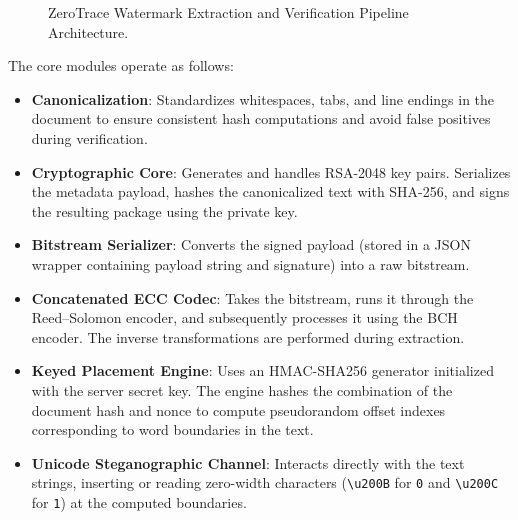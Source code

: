 \documentclass[conference]{IEEEtran}
\begin{document}
\begin{figure}[htbp]
\caption{ZeroTrace Watermark Extraction and Verification Pipeline Architecture.}
\label{fig:extract_pipeline}
\end{figure}

The core modules operate as follows:
\begin{itemize}
    \item \textbf{Canonicalization}: Standardizes whitespaces, tabs, and line endings in the document to ensure consistent hash computations and avoid false positives during verification.
    \item \textbf{Cryptographic Core}: Generates and handles RSA-2048 key pairs. Serializes the metadata payload, hashes the canonicalized text with SHA-256, and signs the resulting package using the private key.
    \item \textbf{Bitstream Serializer}: Converts the signed payload (stored in a JSON wrapper containing payload string and signature) into a raw bitstream.
    \item \textbf{Concatenated ECC Codec}: Takes the bitstream, runs it through the Reed--Solomon encoder, and subsequently processes it using the BCH encoder. The inverse transformations are performed during extraction.
    \item \textbf{Keyed Placement Engine}: Uses an HMAC-SHA256 generator initialized with the server secret key. The engine hashes the combination of the document hash and nonce to compute pseudorandom offset indexes corresponding to word boundaries in the text.
    \item \textbf{Unicode Steganographic Channel}: Interacts directly with the text strings, inserting or reading zero-width characters (\texttt{\textbackslash u200B} for \texttt{0} and \texttt{\textbackslash u200C} for \texttt{1}) at the computed boundaries.
\end{itemize}
\end{document}
